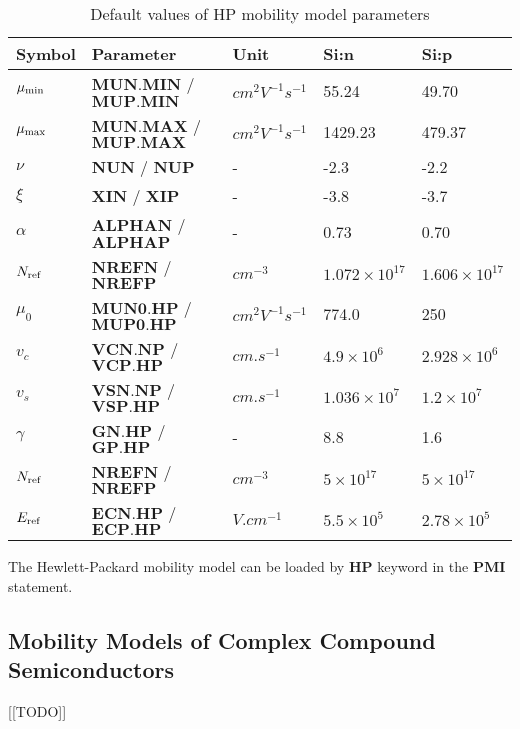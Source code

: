 \documentclass[oneside,12pt]{cgd_book}
\begin{document}
\begin{longtable}{lllll}
\caption{\label{tab:Equation:Mobility:HP:Param}Default values of HP mobility model parameters}\\
\hline
 Symbol
& Parameter
& Unit
& Si:n
& Si:p\\
\hline
 $\mu_{\rm min}$
& $\mathbf{MUN.MIN}$ / $\mathbf{MUP.MIN}$
& $cm^2V^{-1}s^{-1}$
& 55.24
& 49.70
\\
 $\mu_{\rm max}$
& $\mathbf{MUN.MAX}$ / $\mathbf{MUP.MAX}$
& $cm^2V^{-1}s^{-1}$
& 1429.23
& 479.37
\\
 $\nu$
& $\mathbf{NUN}$ / $\mathbf{NUP}$
& -
& -2.3
& -2.2
\\
 $\xi$
& $\mathbf{XIN}$ / $\mathbf{XIP}$
& -
& -3.8
& -3.7
\\
 $\alpha$
& $\mathbf{ALPHAN}$ / $\mathbf{ALPHAP}$
& -
& 0.73
& 0.70
\\
 $N_{\rm ref}$
& $\mathbf{NREFN}$ / $\mathbf{NREFP}$
& $cm^{-3}$
& $1.072\times 10^{17}$
& $1.606\times 10^{17}$
\\
 $\mu_0$
& $\mathbf{MUN0.HP}$ / $\mathbf{MUP0.HP}$
& $cm^2V^{-1}s^{-1}$
& 774.0
& 250
\\
 $v_c$
& $\mathbf{VCN.NP}$ / $\mathbf{VCP.HP}$
& $cm.s^{-1}$
& $4.9\times 10^6$
& $2.928 \times 10^6$
\\
 $v_s$
& $\mathbf{VSN.NP}$ / $\mathbf{VSP.HP}$
& $cm.s^{-1}$
& $1.036\times 10^7$
& $1.2\times 10^7$
\\
 $\gamma$
& $\mathbf{GN.HP}$ / $\mathbf{GP.HP}$
& -
& 8.8
& 1.6
\\
 $N_{\rm ref}$
& $\mathbf{NREFN}$ / $\mathbf{NREFP}$
& $cm^{-3}$
& $5\times 10^{17}$
& $5\times 10^{17}$
\\
 $E_{\rm ref}$
& $\mathbf{ECN.HP}$ / $\mathbf{ECP.HP}$
& $V.cm^{-1}$
& $5.5\times 10^5$
& $2.78\times 10^5$\\
\end{longtable}
The Hewlett-Packard mobility model can be loaded by $\mathbf{HP}$
keyword in the $\mathbf{PMI}$ statement.
\par
\subsection{Mobility Models of Complex Compound Semiconductors}
[[TODO]]
\par
\end{document}
